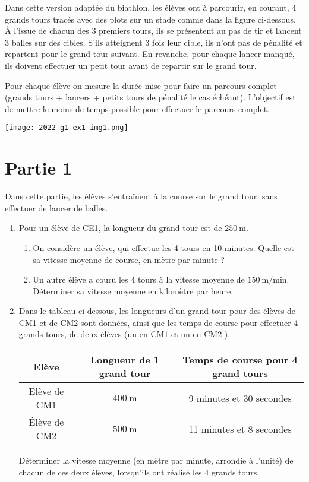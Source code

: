 Dans cette version adaptée du biathlon, les élèves ont à parcourir, en courant, 4 grands tours tracés avec des plots sur un stade comme dans la figure ci-dessous. À l'issue de chacun des 3 premiers tours, ils se présentent au pas de tir et lancent 3 balles sur des cibles. S'ils atteignent 3 fois leur cible, ils n'ont pas de pénalité et repartent pour le grand tour suivant. En revanche, pour chaque lancer manqué, ils doivent effectuer un petit tour avant de repartir sur le grand tour.

Pour chaque élève on mesure la durée mise pour faire un parcours complet (grands tours + lancers + petits tours de pénalité le cas échéant). L'objectif est de mettre le moins de temps possible pour effectuer le parcours complet.

\begin{center}
  \texttt{[image: 2022-g1-ex1-img1.png]}	
\end{center}


\section*{Partie 1}

Dans cette partie, les élèves s'entraînent à la course sur le grand tour, sans effectuer de lancer de balles.

\begin{enumerate}
  \item Pour un élève de CE1, la longueur du grand tour est de $250 \mathrm{~m}$.
  
  \begin{enumerate}
  \item On considère un élève, qui effectue les 4 tours en 10 minutes. Quelle est sa vitesse moyenne de course, en mètre par minute ?
  \item Un autre élève a couru les 4 tours à la vitesse moyenne de $150 \mathrm{~m} / \mathrm{min}$. Déterminer sa vitesse moyenne en kilomètre par heure.
  \end{enumerate}

  \item Dans le tableau ci-dessous, les longueurs d'un grand tour pour des élèves de CM1 et de CM2 sont données, ainsi que les temps de course pour effectuer 4 grands tours, de deux élèves (un en $\mathrm{CM} 1$ et un en $\mathrm{CM} 2$ ).
 
 
 \medskip
\begin{tabular}{|c|c|c|}
\hline
\bfseries Elève & \bfseries Longueur de 1 grand tour & \bfseries Temps de course pour 4 grand tours \\
\hline
Elève de CM1 & $400 \mathrm{~m}$ & 9 minutes et 30 secondes \\
\hline
Élève de CM2 & $500 \mathrm{~m}$ & 11 minutes et 8 secondes \\
\hline
\end{tabular}

\medskip
Déterminer la vitesse moyenne (en mètre par minute, arrondie à l'unité) de chacun de ces deux élèves, lorsqu'ils ont réalisé les 4 grands tours.
\end{enumerate}


